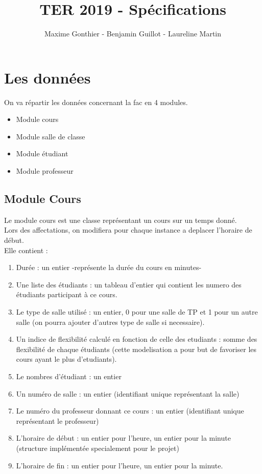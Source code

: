 \documentclass[a4paper,11pt]{article}
\title{TER 2019 - Spécifications}
\author{Maxime Gonthier - Benjamin Guillot - Laureline Martin}
\begin{document}
	\clearpage
	\maketitle

\newpage
\tableofcontents

\newpage
\section{Les données}
	On va répartir les données concernant la fac en 4 modules.\\
	\begin{itemize}
		\item Module cours
		\item Module salle de classe
		\item Module étudiant
		\item Module professeur
	\end{itemize}
	\subsection{Module Cours}
		Le module cours est une classe représentant un cours sur un temps donné.\\
		Lors des affectations, on modifiera pour chaque instance a deplacer l'horaire de début.\\
		Elle contient : 
		\begin{enumerate}
			\item Durée : un entier -représente la durée du cours en minutes-
			\item Une liste des étudiants : un tableau d'entier qui contient les numero des étudiants participant à ce cours.
			\item Le type de salle utilisé : un entier, 0 pour une salle de TP et 1 pour un autre salle (on pourra ajouter d'autres type de salle si necessaire).
			\item Un indice de flexibilité calculé en fonction de celle des etudiants : somme des flexibilité de chaque étudiants (cette modelisation a pour but de favoriser les cours ayant le plus d'etudiants).
			\item Le nombres d'étudiant : un entier
			\item Un numéro de salle : un entier (identifiant unique représentant la salle)
			\item Le numéro du professeur donnant ce cours : un entier (identifiant unique représentant le professeur)
			\item L'horaire de début : un entier pour l'heure, un entier pour la minute (structure implémentée specialement pour le projet)  
			\item L'horaire de fin : un entier pour l'heure, un entier pour la minute.
		\end{enumerate}
\end{document}
